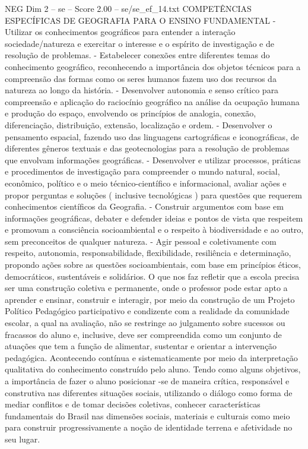 \begin{textsample}{NEG Dim 2 – se – Score 2.00 – se/se\_ef\_14.txt}  \label{ex:f2_neg_268}
COMPETÊNCIAS ESPECÍFICAS DE GEOGRAFIA PARA O ENSINO FUNDAMENTAL - Utilizar os conhecimentos geográficos para entender a interação sociedade/natureza e exercitar o interesse e o espírito de investigação e de resolução de problemas. - Estabelecer conexões entre diferentes temas do conhecimento geográfico, reconhecendo a importância dos objetos técnicos para a compreensão das formas como os seres humanos fazem uso dos recursos da natureza ao longo da história. - Desenvolver autonomia e senso crítico para compreensão e aplicação do raciocínio geográfico na análise da ocupação humana e produção do espaço, envolvendo os princípios de analogia, conexão, diferenciação, distribuição, extensão, localização e ordem. - Desenvolver o pensamento espacial, fazendo uso das linguagens cartográficas e iconográficas, de diferentes gêneros textuais e das geotecnologias para a resolução de problemas que envolvam informações geográficas. - Desenvolver e utilizar processos, práticas e procedimentos de investigação para compreender o mundo natural, social, econômico, político e o meio técnico-científico e informacional, avaliar ações e propor perguntas e soluções ( inclusive tecnológicas ) para questões que requerem conhecimentos científicos da Geografia. - Construir argumentos com base em informações geográficas, debater e defender ideias e pontos de vista que respeitem e promovam a consciência socioambiental e o respeito à biodiversidade e ao outro, sem preconceitos de qualquer natureza. - Agir pessoal e coletivamente com respeito, autonomia, responsabilidade, flexibilidade, resiliência e determinação, propondo ações sobre as questões socioambientais, com base em princípios éticos, democráticos, sustentáveis e solidários.
O que nos faz refletir que a escola precisa ser uma construção coletiva e permanente, onde o professor pode estar apto a aprender e ensinar, construir e interagir, por meio da construção de um Projeto Político Pedagógico participativo e condizente com a realidade da comunidade escolar, a qual na avaliação, não se restringe ao julgamento sobre sucessos ou fracassos do aluno e, inclusive, deve ser compreendida como um conjunto de atuações que tem a função de alimentar, sustentar e orientar a intervenção pedagógica.
Acontecendo contínua e sistematicamente por meio da interpretação qualitativa do conhecimento construído pelo aluno.
Tendo como alguns objetivos, a importância de fazer o aluno posicionar -se de maneira crítica, responsável e construtiva nas diferentes situações sociais, utilizando o diálogo como forma de mediar conflitos e de tomar decisões coletivas, conhecer características fundamentais do Brasil nas dimensões sociais, materiais e culturais como meio para construir progressivamente a noção de identidade terrena e afetividade no seu lugar.

\end{textsample}
